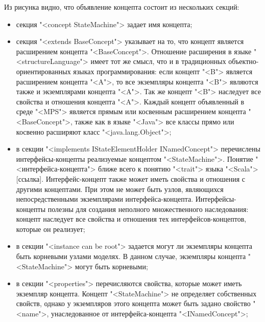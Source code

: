 Из рисунка видно, что объявление концепта состоит из нескольких секций:
\begin{itemize}
 \item секция "<concept StateMachine"> задает имя концепта;

 \item секция "<extends BaseConcept"> указывает на то, что концепт является расширением концепта "<BaseConcept">.
 Отношение расширения в языке "<structureLanguage"> имеет тот же смысл, что и в традиционных объектно-ориентированных
 языках программирования: если концепт "<B"> является расширением концепта "<A">, то все экземпляры концепта "<B">
 являются также и экземплярами концепта "<A">. Так же концепт "<B"> наследует все свойства и отношения концепта
 "<A">.  Каждый концепт объявленный в среде "<MPS"> является прямым или косвенным расширением концепта
 "<BaseConcept">,  также как в языке "<Java"> все классы прямо или косвенно расширяют класс "<java.lang.Object">;

 \item в секции "<implements IStateElementHolder INamedConcept"> перечислены интерфейсы-концепты реализуемые
 концептом "<StateMachine">. Понятие "<интерфейса-концепта"> ближе всего к понятию "<trait"> языка "<Scala"> [ссылка].
 Интерфейс-концепт также может иметь свойства и отношения с другими концептами. При этом не может быть узлов,
 являющихся непосредственными экземплярами интерфейса-концепта. Интерфейсы-концепты полезны для создания неполного
 множественного наследования: концепт наследует все свойства и отношения тех интерфейсов-концептов, которые он
 реализует;

 \item в секции "<instance can be root"> задается могут ли экземпляры концепта быть корневыми узлами моделях. В
 данном случае, экземпляры концепта "<StateMachine"> могут быть корневыми;

 \item в секции "<properties"> перечисляются свойства, которые может иметь экземпляр концепта. Концепт "<StateMachine"> не определяет собственных свойств, однако у экземпляров этого концепта может быть задано свойство "<name">, унаследованное от интерфейса-концепта "<INamedConcept">;


\end{itemize}
